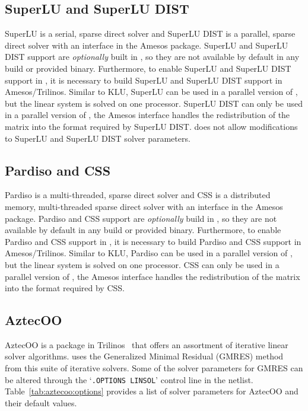 \subsection{SuperLU and SuperLU DIST}
SuperLU is a serial, sparse direct solver and SuperLU DIST is a parallel, sparse direct solver with an interface in the 
Amesos package.  SuperLU and SuperLU DIST support are {\it optionally} built in \Xyce{},
so they are not available by default in any \Xyce{} build or provided binary.  Furthermore, to enable SuperLU and 
SuperLU DIST support in \Xyce{}, it is necessary to build SuperLU and SuperLU DIST support in Amesos/Trilinos.  Similar to KLU, 
SuperLU can be used in a parallel version of \Xyce{}, but the linear system is 
solved on one processor.  SuperLU DIST can only be used in a parallel version of \Xyce{}, the Amesos interface handles the redistribution
of the matrix into the format required by SuperLU DIST.  
\Xyce{} does not allow modifications to SuperLU and SuperLU DIST solver parameters. 

\subsection{Pardiso and CSS}
Pardiso is a multi-threaded, sparse direct solver and CSS is a distributed memory, multi-threaded sparse direct solver
with an interface in the Amesos package.  Pardiso and CSS support are {\it optionally} build in \Xyce{},
so they are not available by default in any \Xyce{} build or provided binary.  Furthermore, to enable Pardiso and
CSS support in \Xyce{}, it is necessary to build Pardiso and CSS support in Amesos/Trilinos.  Similar to KLU,
Pardiso can be used in a parallel version of \Xyce{}, but the linear system is solved on one processor.  CSS can
only be used in a parallel version of \Xyce{}, the Amesos interface handles the redistribution of the matrix into
the format required by CSS.

\subsection{AztecOO}
AztecOO is a package in Trilinos~\cite{trilinos:toms} that offers an assortment of iterative linear solver algorithms.  
\Xyce{} uses the Generalized Minimal Residual (GMRES) method~\cite{sasc86} from this suite of iterative solvers.  
Some of the solver parameters for GMRES can be altered through the `\texttt{.OPTIONS LINSOL}' control line in the netlist. 
Table~\ref{tab:aztecoo:options} provides a list of solver parameters for AztecOO and their default values.

